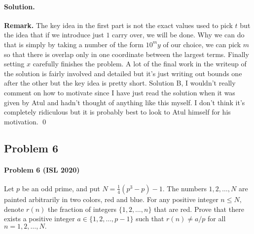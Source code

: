 \documentclass[12pt]{article}
\newenvironment{solution}
{\paragraph{Solution.}}
{\qed\eject}
\begin{document}
\begin{solution}
\textbf{Remark.} The key idea in the first part is not the exact values used to pick $t$ but the idea that if we introduce just $1$ carry over, we will be done. Why we can do that is simply by taking a number of the form $10^{m}y$ of our choice, we can pick $m$ so that there is overlap only in one coordinate between the largest terms. Finally setting $x$ carefully finishes the problem. A lot of the final work in the writeup of the solution is fairly involved and detailed but it's just writing out bounds one after the other but the key idea is pretty short. Solution B, I wouldn't really comment on how to motivate since I have just read the solution when it was given by Atul and hadn't thought of anything like this myself. I don't think it's completely ridiculous but it is probably best to look to Atul himself for his motivation. 
\end{solution}

\subsection*{Problem 6} 

\paragraph*{\textbf{Problem 6} (ISL 2020)} Let $p$ be an odd prime, and put $N=\frac{1}{4} (p^3 -p) -1.$ The numbers $1,2, \dots, N$ are painted arbitrarily in two colors, red and blue. For any positive integer $n \leqslant N,$ denote $r(n)$ the fraction of integers $\{ 1,2, \dots, n \}$ that are red.
Prove that there exists a positive integer $a \in \{ 1,2, \dots, p-1\}$ such that $r(n) \neq a/p$ for all $n = 1,2, \dots , N.$
\end{document}
